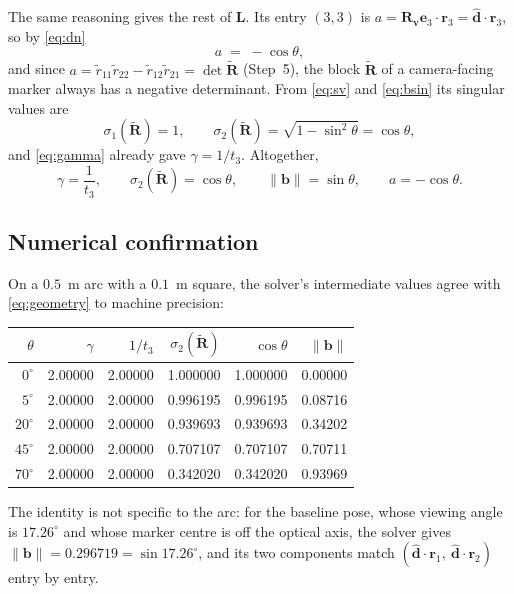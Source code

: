 \documentclass[11pt,a4paper]{article}
\theoremstyle{remark}
\newcommand{\Rtil}{\widetilde{\mathbf{R}}}
\newcommand{\Lmat}{\mathbf{L}}
\newcommand{\Rvee}{\mathbf{R}_{\vvec}}
\newcommand{\bvec}{\mathbf{b}}
\newcommand{\evec}{\mathbf{e}}
\newcommand{\rvec}{\mathbf{r}}
\newcommand{\vvec}{\mathbf{v}}
\newcommand{\dhat}{\hat{\mathbf{d}}}
\begin{document}
The same reasoning gives the rest of $\Lmat$. Its entry $(3,3)$ is
$a = \Rvee\evec_3\cdot\rvec_3 = \dhat\cdot\rvec_3$, so by \eqref{eq:dn}
\begin{equation}
  a \;=\; -\cos\theta ,
  \label{eq:acos}
\end{equation}
and since $a = \tilde r_{11}\tilde r_{22} - \tilde r_{12}\tilde r_{21}
= \det\Rtil$ (Step~5), the block $\Rtil$ of a camera-facing marker always has a
negative determinant. From \eqref{eq:sv} and \eqref{eq:bsin} its singular
values are
\begin{equation}
  \sigma_1(\Rtil) = 1,
  \qquad
  \sigma_2(\Rtil) = \sqrt{1-\sin^2\theta} = \cos\theta ,
  \label{eq:svcos}
\end{equation}
and \eqref{eq:gamma} already gave $\gamma = 1/t_3$. Altogether,
\begin{equation}
  \gamma = \frac{1}{t_3},
  \qquad
  \sigma_2(\Rtil) = \cos\theta,
  \qquad
  \|\bvec\| = \sin\theta,
  \qquad
  a = -\cos\theta .
  \label{eq:geometry}
\end{equation}

\subsection{Numerical confirmation}

On a $0.5$~m arc with a $0.1$~m square, the solver's intermediate values agree
with \eqref{eq:geometry} to machine precision:

\begin{center}
\begin{tabular}{@{}rrrrrr@{}}
\toprule
$\theta$ & $\gamma$ & $1/t_3$ & $\sigma_2(\Rtil)$ & $\cos\theta$
  & $\|\bvec\|$ \\
\midrule
$0^{\circ}$  & 2.00000 & 2.00000 & 1.000000 & 1.000000 & 0.00000 \\
$5^{\circ}$  & 2.00000 & 2.00000 & 0.996195 & 0.996195 & 0.08716 \\
$20^{\circ}$ & 2.00000 & 2.00000 & 0.939693 & 0.939693 & 0.34202 \\
$45^{\circ}$ & 2.00000 & 2.00000 & 0.707107 & 0.707107 & 0.70711 \\
$70^{\circ}$ & 2.00000 & 2.00000 & 0.342020 & 0.342020 & 0.93969 \\
\bottomrule
\end{tabular}
\end{center}

\noindent
The identity is not specific to the arc: for the baseline pose, whose viewing
angle is $17.26^{\circ}$ and whose marker centre is off the optical axis, the
solver gives $\|\bvec\| = 0.296719 = \sin 17.26^{\circ}$, and its two components
match $(\dhat\cdot\rvec_1,\ \dhat\cdot\rvec_2)$ entry by entry.
\end{document}
